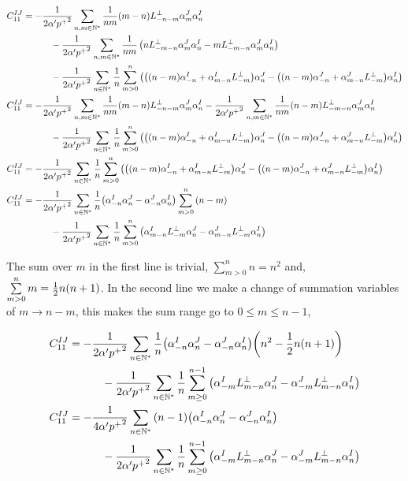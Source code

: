 \begin{align*}
    C_{11}^{IJ}&=-\frac{1}{2\alpha'{p^+}^2}\sum\limits_{n,m\in\mathbb N^\ast}\frac{1}{nm}\qty(m-n)L^\perp_{-n-m}\alpha^J_m\alpha^I_n\\
    &\quad\quad\quad-\frac{1}{2\alpha'{p^+}^2}\sum\limits_{n,m\in\mathbb N^\ast}\frac{1}{nm}\left(nL^\perp_{-m-n}\alpha^J_m\alpha^I_{n}-mL^\perp_{-m-n}\alpha^J_{m}\alpha^I_n\right)\\
    &\quad\quad\quad-\frac{1}{2\alpha'{p^+}^2}\sum\limits_{n\in\mathbb N^\ast}\frac{1}{n}\sum\limits_{m>0}^{n}\left(\qty(\qty(n-m)\alpha^I_{-n}+\alpha_{m-n}^IL^\perp_{-m})\alpha^J_n-\qty(\qty(n-m)\alpha^J_{-n}+\alpha^J_{m-n}L^\perp_{-m})\alpha^I_n\right)\\
    C_{11}^{IJ}&=-\frac{1}{2\alpha'{p^+}^2}\sum\limits_{n,m\in\mathbb N^\ast}\frac{1}{nm}\qty(m-n)L^\perp_{-n-m}\alpha^J_m\alpha^I_n-\frac{1}{2\alpha'{p^+}^2}\sum\limits_{n,m\in\mathbb N^\ast}\frac{1}{nm}\qty(n-m)L^\perp_{-m-n}\alpha^J_m\alpha^I_{n}\\
    &\quad\quad\quad-\frac{1}{2\alpha'{p^+}^2}\sum\limits_{n\in\mathbb N^\ast}\frac{1}{n}\sum\limits_{m>0}^{n}\left(\qty(\qty(n-m)\alpha^I_{-n}+\alpha_{m-n}^IL^\perp_{-m})\alpha^J_n-\qty(\qty(n-m)\alpha^J_{-n}+\alpha^J_{m-n}L^\perp_{-m})\alpha^I_n\right)\\
    C_{11}^{IJ}&=-\frac{1}{2\alpha'{p^+}^2}\sum\limits_{n\in\mathbb N^\ast}\frac{1}{n}\sum\limits_{m>0}^{n}\left(\qty(\qty(n-m)\alpha^I_{-n}+\alpha_{m-n}^IL^\perp_{-m})\alpha^J_n-\qty(\qty(n-m)\alpha^J_{-n}+\alpha^J_{m-n}L^\perp_{-m})\alpha^I_n\right)\\
    C_{11}^{IJ}&=-\frac{1}{2\alpha'{p^+}^2}\sum\limits_{n\in\mathbb N^\ast}\frac{1}{n}\qty(\alpha^I_{-n}\alpha^J_n-\alpha^J_{-n}\alpha^I_n)\sum\limits_{m>0}^{n}\qty(n-m)\\
    &\quad\quad\quad-\frac{1}{2\alpha'{p^+}^2}\sum\limits_{n\in\mathbb N^\ast}\frac{1}{n}\sum\limits_{m>0}^{n}\qty(\alpha_{m-n}^IL^\perp_{-m}\alpha^J_n-\alpha^J_{m-n}L^\perp_{-m}\alpha^I_n)
\end{align*}

The sum over $m$ in the first line is trivial, $\sum\limits_{m>0}^nn=n^2$ and, $\sum\limits_{m>0}^nm=\frac12n\qty(n+1)$. In the second line we make a 
change of summation variables of $m\rightarrow n-m$, this makes the sum range go to $0\leq m\leq n-1$,

\begin{align*}
    C_{11}^{IJ}&=-\frac{1}{2\alpha'{p^+}^2}\sum\limits_{n\in\mathbb N^\ast}\frac{1}{n}\qty(\alpha^I_{-n}\alpha^J_n-\alpha^J_{-n}\alpha^I_n)\qty(n^2-\frac12n\qty(n+1))\\
    &\quad\quad\quad-\frac{1}{2\alpha'{p^+}^2}\sum\limits_{n\in\mathbb N^\ast}\frac{1}{n}\sum\limits_{m\geq0}^{n-1}\qty(\alpha_{-m}^IL^\perp_{m-n}\alpha^J_n-\alpha^J_{-m}L^\perp_{m-n}\alpha^I_n)\\
    C_{11}^{IJ}&=-\frac{1}{4\alpha'{p^+}^2}\sum\limits_{n\in\mathbb N^\ast}\qty(n-1)\qty(\alpha^I_{-n}\alpha^J_n-\alpha^J_{-n}\alpha^I_n)\\
    &\quad\quad\quad-\frac{1}{2\alpha'{p^+}^2}\sum\limits_{n\in\mathbb N^\ast}\frac{1}{n}\sum\limits_{m\geq0}^{n-1}\qty(\alpha_{-m}^IL^\perp_{m-n}\alpha^J_n-\alpha^J_{-m}L^\perp_{m-n}\alpha^I_n)
\end{align*}

